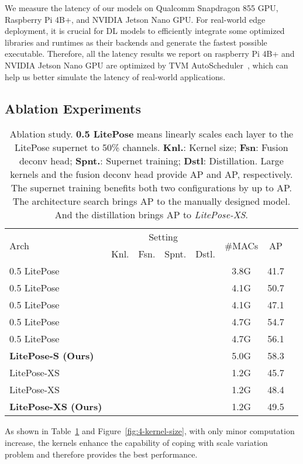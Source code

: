\documentclass[10pt,twocolumn,letterpaper]{article}
\begin{document}
 We measure the latency of our models on Qualcomm Snapdragon 855 GPU, Raspberry Pi 4B+, and NVIDIA Jetson Nano GPU. For real-world edge deployment, 
it is crucial for DL models to efficiently integrate some optimized libraries and runtimes as their backends and generate the fastest possible executable.
Therefore, all the latency results we report on raspberry Pi 4B+ and NVIDIA Jetson Nano GPU are optimized by TVM AutoScheduler~\cite{chen2018tvm,zheng2020ansor}, which can help us better simulate the latency of real-world applications.

\subsection{Ablation Experiments}
\label{subsec:ablation}



\begin{table}[h]
\setlength{\tabcolsep}{3.5pt}
  \centering
  \small
  \begin{tabular}{lccccccc}
    \toprule
    \multirow{2}{*}[\multirowcenter]{Arch} & \multicolumn{4}{c}{Setting} & \multirow{2}{*}[\multirowcenter]{\#MACs} & \multirow{2}{*}[\multirowcenter]{AP} \\
    \cmidrule{2-5}
    & Knl. & Fsn. & Spnt. & Dstl. \\
    \midrule
    0.5 LitePose &  &  & & & 3.8G & 41.7 \\
    0.5 LitePose &  &  & & & 4.1G & 50.7 \\
    0.5 LitePose &  & & & & 4.1G & 47.1 \\
    0.5 LitePose &  &  & & & 4.7G & 54.7 \\
    0.5 LitePose &  &  &  & & 4.7G & 56.1 \\
    \textbf{LitePose-S (Ours)} &  &  &  & & 5.0G & 58.3 \\
    \midrule
    LitePose-XS &  &  &  & & 1.2G & 45.7 \\
    LitePose-XS &  &  &  & & 1.2G & 48.4 \\
    \textbf{LitePose-XS (Ours)} &  &  &  &  & 1.2G & 49.5\\
    \bottomrule
  \end{tabular}
  \caption{Ablation study. \textbf{0.5 LitePose} means linearly scales each layer to the LitePose supernet to 50\% channels. \textbf{Knl.}: Kernel size; \textbf{Fsn}: Fusion deconv head; \textbf{Spnt.}: Supernet training; \textbf{Dstl}: Distillation. Large kernels and the fusion deconv head provide AP and AP, respectively. The supernet training benefits both two configurations by up to AP. The architecture search brings AP to the manually designed model. And the distillation brings AP to \textit{LitePose-XS}. }
  \label{tab:ablation}
\end{table} 
 As shown in Table~\ref{tab:ablation} and Figure~\ref{fig:4-kernel-size}, with only minor computation increase, the  kernels enhance the capability of coping with scale variation problem and therefore provides the best performance.
\end{document}
